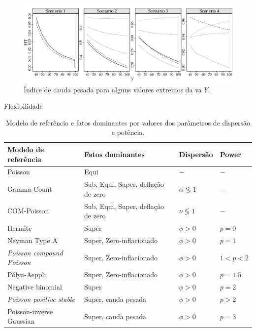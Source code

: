 \documentclass[10pt, aspectratio=169]{beamer}\usepackage[]{graphicx}\usepackage[]{color}
\begin{document}

\begin{frame}[fragile]
\begin{figure}[h]
\includegraphics[scale=0.6]{images/heavytail-1.png}
\caption{Índice de cauda pesada para alguns valores extremos da va $Y$.}
\label{Fig3}
\centering
\end{figure}
\end{frame}


\begin{frame}[fragile]{Flexibilidade}
\begin{table}[h]
\centering
\caption{Modelo de referência e fatos dominantes por valores dos parâmetros de dispersão e potência.}
\label{tab:model}
\begin{tabular}{llll} \hline
Modelo de referência     & Fatos dominantes                     & Dispersão           & Power   \\ \hline
Poisson                  & Equi                                 & $-$          & $-$      \\
Gamma-Count              & Sub, Equi, Super, deflação de zero   & $\alpha \lessgtr 1$ & $-$ \\
COM-Poisson              & Sub, Equi, Super, deflação de zero   & $\nu \lessgtr 1$    & $-$ \\
Hermite                  & Super                                & $\phi > 0$    & $p = 0$   \\
Neyman Type A            & Super, Zero-inflacionado             & $\phi > 0$          & $p = 1$ \\
\textit{Poisson compound Poisson} & Super, Zero-inflacionado    & $\phi > 0$ & $1 < p < 2$ \\
P\'olya-Aeppli           & Super, Zero-inflacionado             & $\phi > 0$ & $p = 1.5$ \\
Negative binomial        & Super                                & $\phi > 0$ & $p = 2$ \\
\textit{Poisson positive stable}  & Super, cauda pesada         & $\phi > 0$       & $p > 2$ \\
Poisson-inverse Gaussian & Super, cauda pesada                  & $\phi > 0$       & $p = 3$ \\ \hline
\end{tabular}
\end{table}
\end{frame}
\end{document}
